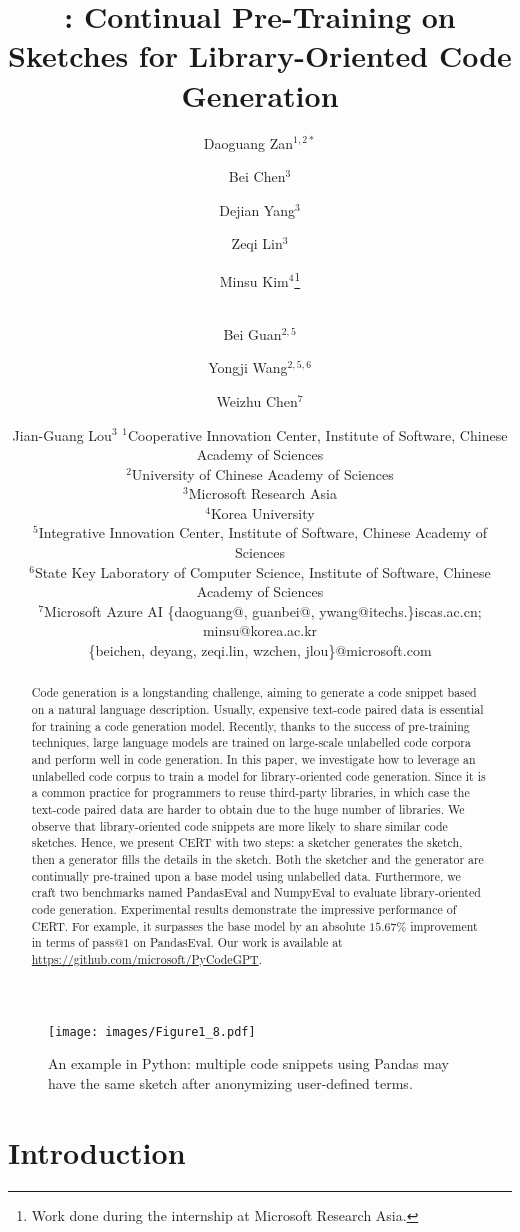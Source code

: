 \documentclass{article}
\title{\cert: Continual Pre-Training on Sketches for Library-Oriented Code Generation}
\author{
Daoguang Zan$^{1,2*}$\and
Bei Chen$^3$\and
Dejian Yang$^3$\and
Zeqi Lin$^3$\and
Minsu Kim$^{4}$\thanks{Work done during the internship at Microsoft Research Asia.}\and\\
Bei Guan$^{2,5}$\and
Yongji Wang$^{2,5,6}$\and
Weizhu Chen$^7$\and
Jian-Guang Lou$^{3}$
\affiliations
$^1$Cooperative Innovation Center, Institute of Software, Chinese Academy of Sciences\\
$^2$University of Chinese Academy of Sciences\\ 
$^3$Microsoft Research Asia\\ 
$^4$Korea University\\
$^5$Integrative Innovation Center, Institute of Software, Chinese Academy of Sciences\\
$^6$State Key Laboratory of Computer Science, Institute of Software, Chinese Academy of Sciences\\
$^7$Microsoft Azure AI
\emails
\{daoguang@, guanbei@, ywang@itechs.\}iscas.ac.cn; minsu@korea.ac.kr\\
\{beichen, deyang, zeqi.lin, wzchen, jlou\}@microsoft.com
}
\newcommand{\cert}{\textsc{CERT}\xspace}
\newcommand{\peval}{PandasEval\xspace}
\newcommand{\neval}{NumpyEval\xspace}
\newcommand{\pandas}{Pandas\xspace}
\begin{document}
\maketitle

\begin{abstract}

Code generation is a longstanding challenge, aiming to generate a code snippet based on a natural language description. Usually, expensive text-code paired data is essential for training a code generation model. Recently, thanks to the success of pre-training techniques, large language models are trained on large-scale unlabelled code corpora and perform well in code generation. In this paper, we investigate how to leverage an unlabelled code corpus to train a model for library-oriented code generation. Since it is a common practice for programmers to reuse third-party libraries, in which case the text-code paired data are harder to obtain due to the huge number of libraries. We observe that library-oriented code snippets are more likely to share similar code sketches. Hence, we present \cert with two steps: a sketcher generates the sketch, then a generator fills the details in the sketch. Both the sketcher and the generator are continually pre-trained upon a base model using unlabelled data. Furthermore, we craft two benchmarks named \peval and \neval to evaluate library-oriented code generation. Experimental results demonstrate the impressive performance of \cert. For example, it surpasses the base model by an absolute $15.67\%$ improvement in terms of pass$@1$ on \peval. Our work is available at \url{https://github.com/microsoft/PyCodeGPT}.

\end{abstract}

\begin{figure}[t]
    \small
    \centering
    \texttt{[image: images/Figure1\_8.pdf]}
\caption{ An example in Python: multiple code snippets using \pandas may have the same sketch after anonymizing user-defined terms.
    }
    \label{fig:figure1}
\end{figure}

\section{Introduction} \label{introduction}
\end{document}
